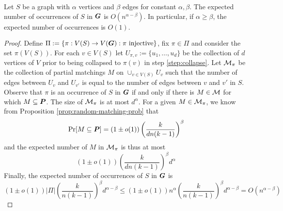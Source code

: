 \begin{proposition}	\label{prop:subgraph-count}
	Let $S$ be a graph with $\alpha$ vertices and $\beta$ edges for constant $\alpha,\beta$.  The expected number of occurrences of $S$ in $\boldsymbol{G}$ is $O(n^{\alpha-\beta})$.  In particular, if $\alpha \ge \beta$, the expected number of occurrences is $O(1)$.
\end{proposition}
\begin{proof}
	Define $\Pi:=\{\pi:V(S)\rightarrow V(\boldsymbol{G}):\pi~\text{injective}\}$, fix $\pi\in\Pi$ and consider the set $\pi(V(S))$.  For each $v\in V(S)$ let $U_{\pi,v}:=\{u_1,\dots,u_d\}$ be the collection of $d$ vertices of $V$ prior to being collapsed to $\pi(v)$ in step \ref{step:collapse}.  Let $\mathcal{M}_{\pi}$ be the collection of partial matchings $M$ on $\cup_{v\in V(S)} U_v$ such that the number of edges between $U_v$ and $U_{v'}$ is equal to the number of edges between $v$ and $v'$ in $S$.  Observe that $\pi$ is an occurrence of $S$ in $\boldsymbol{G}$ if and only if there is $M\in\mathcal{M}$ for which $M\subseteq\boldsymbol{P}$.  The size of $\mathcal{M}_{\pi}$ is at most $d^{\alpha}$.  For a given $M\in\mathcal{M}_{\pi}$, we know from Proposition \ref{prop:random-matching-prob} that
	\[
		\Pr[M\subseteq\boldsymbol{P}] = (1\pm o(1))\left(\frac{k}{dn(k-1)}\right)^{\beta}
	\]
	and the expected number of $M$ in $\mathcal{M}_{\pi}$ is thus at most
	\[
		(1\pm o(1))\left(\frac{k}{dn(k-1)}\right)^{\beta}d^{\alpha}
	\]
	Finally, the expected number of occurrences of $S$ in $\boldsymbol{G}$ is
	\[
		(1\pm o(1))|\Pi|\left(\frac{k}{n(k-1)}\right)^{\beta}d^{\alpha-\beta} \le (1\pm o(1))n^{\alpha}\left(\frac{k}{n(k-1)}\right)^{\beta}d^{\alpha-\beta} = O(n^{\alpha-\beta})
	\]
\end{proof}


